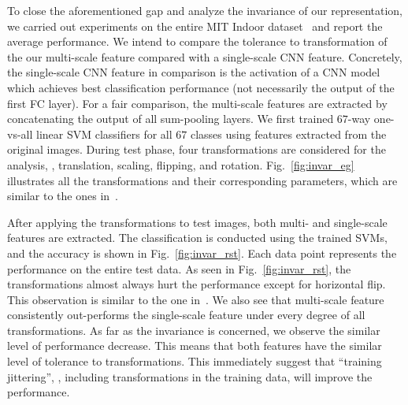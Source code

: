 \documentclass[10pt,twocolumn,letterpaper]{article}
\begin{document}
To close the aforementioned gap and analyze the invariance of our representation, we carried out experiments on the entire MIT Indoor dataset~\cite{MIT67} and report the average performance. We intend to compare the tolerance to transformation of the our multi-scale feature compared with a single-scale CNN feature. Concretely, the single-scale CNN feature in comparison is the activation of a CNN model which achieves best classification performance (not necessarily the output of the first FC layer). For a fair comparison, the multi-scale features are extracted by concatenating the output of all sum-pooling layers. We first trained $67$-way one-vs-all linear SVM classifiers for all $67$ classes using features extracted from the original images. During test phase, four transformations are considered for the analysis, \ie, translation, scaling, flipping, and rotation. Fig.~\ref{fig:invar_eg} illustrates all the transformations and their corresponding parameters, which are similar to the ones in~\cite{Gong14}. 

After applying the transformations to test images, both multi- and single-scale features are extracted. The classification is conducted using the trained SVMs, and the accuracy is shown in Fig.~\ref{fig:invar_rst}. Each data point represents the performance on the entire test data. As seen in Fig.~\ref{fig:invar_rst}, the transformations almost always hurt the performance except for horizontal flip. This observation is similar to the one in~\cite{Gong14}. We also see that multi-scale feature consistently out-performs the single-scale feature under every degree of all transformations. As far as the invariance is concerned, we observe the similar level of performance decrease. This means that both features have the similar level of tolerance to transformations. This immediately suggest that ``training jittering'', \ie, including transformations in the training data, will improve the performance. 
\end{document}
